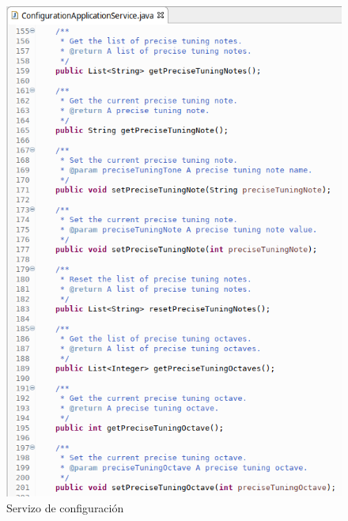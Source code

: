    \begin{figure}[htbp]
    \centering
    \includegraphics[scale=0.6, keepaspectratio=true]{./imagenes/servizo-configuracion-4.png}
    \caption{Servizo de configuración}
    \label{figura:ServizoConfiguracion4}
   \end{figure}
   
